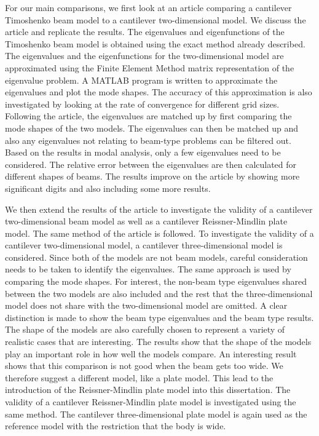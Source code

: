 \documentclass[../main.tex]{subfiles}
\begin{document}
For our main comparisons, we first look at an article comparing a cantilever Timoshenko beam model to a cantilever two-dimensional model. We discuss the article and replicate the results. The eigenvalues and eigenfunctions of the Timoshenko beam model is obtained using the exact method already described. The eigenvalues and the eigenfunctions for the two-dimensional model are approximated using the Finite Element Method matrix representation of the eigenvalue problem. A MATLAB program is written to approximate the eigenvalues and plot the mode shapes. The accuracy of this approximation is also investigated by looking at the rate of convergence for different grid sizes. Following the article, the eigenvalues are matched up by first comparing the mode shapes of the two models. The eigenvalues can then be matched up and also any eigenvalues not relating to beam-type problems can be filtered out. Based on the results in modal analysis, only a few eigenvalues need to be considered. The relative error between the eigenvalues are then calculated for different shapes of beams. The results improve on the article by showing more significant digits and also including some more results. 

We then extend the results of the article to investigate the validity of a cantilever two-dimensional beam model as well as a cantilever Reissner-Mindlin plate model. The same method of the article is followed. To investigate the validity of a cantilever two-dimensional model, a cantilever three-dimensional model is considered. Since both of the models are not beam models, careful consideration needs to be taken to identify the eigenvalues. The same approach is used by comparing the mode shapes. For interest, the non-beam type eigenvalues shared between the two models are also included and the rest that the three-dimensional model does not share with the two-dimensional model are omitted. A clear distinction is made to show the beam type eigenvalues and the beam type results. The shape of the models are also carefully chosen to represent a variety of realistic cases that are interesting. The results show that the shape of the models play an important role in how well the models compare. An interesting result shows that this comparison is not good when the beam gets too wide. We therefore suggest a different model, like a plate model. This lead to the introduction of the Reissner-Mindlin plate model into this dissertation. The validity of a cantilever Reissner-Mindlin plate model is investigated using the same method. The cantilever three-dimensional plate model is again used as the reference model with the restriction that the body is wide.
\end{document}
